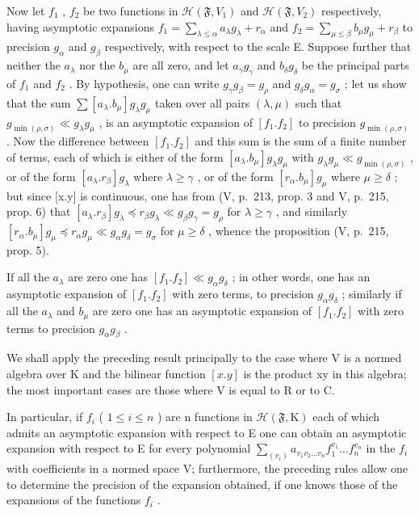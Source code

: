 Now let \(f_{1}\) , \(f_{2}\) be two functions in \(\mathcal{H}(\mathfrak{F}, V_{1})\) and \(\mathcal{H}(\mathfrak{F}, V_{2})\) respectively, having asymptotic expansions \(f_{1} = \sum_{\lambda \leqslant \alpha} a_{\lambda} g_{\lambda} + r_{\alpha}\) and \(f_{2} = \sum_{\mu \leqslant \beta} b_{\mu} g_{\mu} + r_{\beta}\) to precision \(g_{\alpha}\) and \(g_{\beta}\) respectively, with respect to the scale E. Suppose further that neither the \(a_{\lambda}\) nor the \(b_{\mu}\) are all zero, and let \(a_{\gamma} g_{\gamma}\) and \(b_{\delta} g_{\delta}\) be the principal parts of \(f_{1}\) and \(f_{2}\) . By hypothesis, one can write \(g_{\gamma} g_{\beta} = g_{\rho}\) and \(g_{\delta} g_{\alpha} = g_{\sigma}\) ; let us show that the sum \(\sum[a_{\lambda}.b_{\mu}]g_{\lambda}g_{\mu}\) taken over all pairs \((\lambda,\mu)\) such that \(g_{\min(\rho,\sigma)}\ll g_{\lambda}g_{\mu}\) , is an asymptotic expansion of \([f_{1}.f_{2}]\) to precision \(g_{\min(\rho,\sigma)}\) . Now the difference between \([f_{1}.f_{2}]\) and this sum is the sum of a finite number of terms, each of which is either of the form \([a_{\lambda}.b_{\mu}]g_{\lambda}g_{\mu}\) with \(g_{\lambda}g_{\mu}\ll g_{\min(\rho,\sigma)}\) , or of the form \([a_{\lambda}.r_{\beta}]g_{\lambda}\) where \(\lambda\geqslant\gamma\) , or of the form \([r_{\alpha}.b_{\mu}]g_{\mu}\) where \(\mu\geqslant\delta\) ; but since {[}x.y{]} is continuous, one has from (V, p.~213, prop. 3 and V, p.~215, prop. 6) that \([a_{\lambda}.r_{\beta}]g_{\lambda}\preccurlyeq r_{\beta}g_{\lambda}\ll g_{\beta}g_{\gamma}=g_{\rho}\) for \(\lambda\geqslant\gamma\) , and similarly \([r_{\alpha}.b_{\mu}]g_{\mu}\preccurlyeq r_{\alpha}g_{\mu}\ll g_{\alpha}g_{\delta}=g_{\sigma}\) for \(\mu\geqslant\delta\) , whence the proposition (V, p.~215, prop. 5).

If all the \(a_{\lambda}\) are zero one has \([f_{1}.f_{2}] \ll g_{\alpha}g_{\delta}\) ; in other words, one has an asymptotic expansion of \([f_{1}.f_{2}]\) with zero terms, to precision \(g_{\alpha}g_{\delta}\) ; similarly if all the \(a_{\lambda}\) and \(b_{\mu}\) are zero one has an asymptotic expansion of \([f_{1}.f_{2}]\) with zero terms to precision \(g_{\alpha}g_{\beta}\) .

We shall apply the preceding result principally to the case where V is a normed algebra over K and the bilinear function \([x.y]\) is the product xy in this algebra; the most important cases are those where V is equal to R or to C.

In particular, if \(f_{i}\) ( \(1 \leqslant i \leqslant n\) ) are n functions in \(\mathcal{H}(\mathfrak{F}, \mathrm{K})\) each of which admits an asymptotic expansion with respect to E one can obtain an asymptotic expansion with respect to E for every polynomial \(\sum_{(v_{i})} a_{v_{1}v_{2}\ldots v_{n}} f_{1}^{v_{1}} \ldots f_{n}^{v_{n}}\) in the \(f_{i}\) with coefficients in a normed space V; furthermore, the preceding rules allow one to determine the precision of the expansion obtained, if one knows those of the expansions of the functions \(f_{i}\) .

